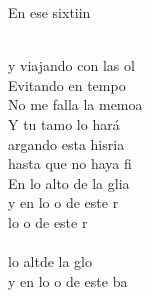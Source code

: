 \begin{cancion}[Sixtinain][Guitarricadelafuente]
	En ese sixtiin \\\jump\\
	\begin{chorus}%
	y viajando con las ol\\
	Evitando en tempo\\
	No me falla la memoa\\
	Y tu tamo lo hará\\
\jump
	argando esta hisria \\
	hasta que no haya fi\\
	En lo alto de la glia \\
	y en lo o de este r  \\
\jump
	lo o de este r\\
\jump
	   \\
	 lo altde la glo \\
	y en lo o de este ba\\
	\end{chorus}%
	\jump\\
\end{cancion}%
